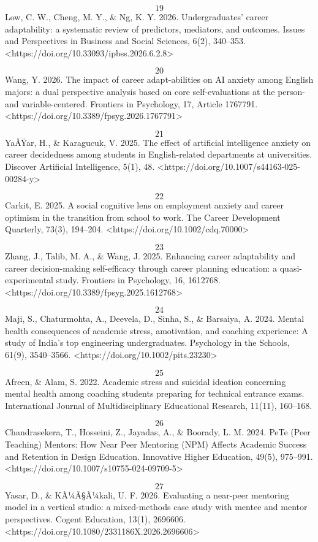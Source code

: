 \textbf{\[19\]} Low, C. W., Cheng, M. Y., \& Ng, K. Y. 2026. Undergraduates' career adaptability: a systematic review of predictors, mediators, and outcomes. Issues and Perspectives in Business and Social Sciences, 6(2), 340--353. <https://doi.org/10.33093/ipbss.2026.6.2.8>

\textbf{\[20\]} Wang, Y. 2026. The impact of career adapt-abilities on AI anxiety among English majors: a dual perspective analysis based on core self-evaluations at the person- and variable-centered. Frontiers in Psychology, 17, Article 1767791. <https://doi.org/10.3389/fpsyg.2026.1767791>

\textbf{\[21\]} YaÅŸar, H., \& Karagucuk, V. 2025. The effect of artificial intelligence anxiety on career decidedness among students in English-related departments at universities. Discover Artificial Intelligence, 5(1), 48. <https://doi.org/10.1007/s44163-025-00284-y>

\textbf{\[22\]} Carkit, E. 2025. A social cognitive lens on employment anxiety and career optimism in the transition from school to work. The Career Development Quarterly, 73(3), 194--204. <https://doi.org/10.1002/cdq.70000>

\textbf{\[23\]} Zhang, J., Talib, M. A., \& Wang, J. 2025. Enhancing career adaptability and career decision-making self-efficacy through career planning education: a quasi-experimental study. Frontiers in Psychology, 16, 1612768. <https://doi.org/10.3389/fpsyg.2025.1612768>

\textbf{\[24\]} Maji, S., Chaturmohta, A., Deevela, D., Sinha, S., \& Barsaiya, A. 2024. Mental health consequences of academic stress, amotivation, and coaching experience: A study of India's top engineering undergraduates. Psychology in the Schools, 61(9), 3540--3566. <https://doi.org/10.1002/pits.23230>

\textbf{\[25\]} Afreen, \& Alam, S. 2022. Academic stress and suicidal ideation concerning mental health among coaching students preparing for technical entrance exams. International Journal of Multidisciplinary Educational Research, 11(11), 160--168.

\textbf{\[26\]} Chandrasekera, T., Hosseini, Z., Jayadas, A., \& Boorady, L. M. 2024. PeTe (Peer Teaching) Mentors: How Near Peer Mentoring (NPM) Affects Academic Success and Retention in Design Education. Innovative Higher Education, 49(5), 975--991. <https://doi.org/10.1007/s10755-024-09709-5>

\textbf{\[27\]} Yasar, D., \& KÃ¼Ã§Ã¼kali, U. F. 2026. Evaluating a near-peer mentoring model in a vertical studio: a mixed-methods case study with mentee and mentor perspectives. Cogent Education, 13(1), 2696606. <https://doi.org/10.1080/2331186X.2026.2696606>

